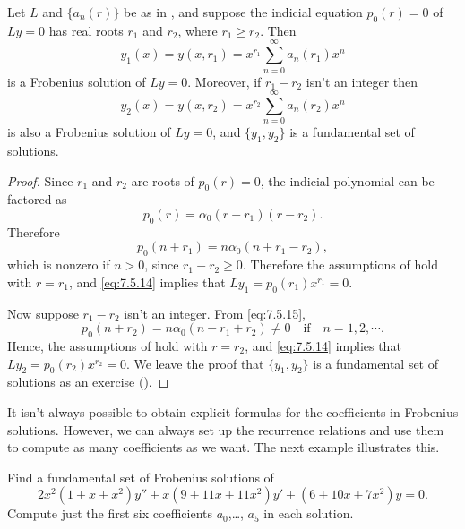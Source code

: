 \begin{theorem}\label{thmtype:7.5.3}
Let $L$ and $\{a_n(r)\}$ be as in , and
suppose the
indicial equation $p_0(r)=0$ of $Ly=0$ has real roots $r_1$ and $r_2$,
where $r_1\ge r_2$. Then
\[
y_1(x)=y(x,r_1)=x^{r_1}\sum_{n=0}^\infty a_n(r_1)x^n
\]
is a Frobenius solution of $Ly=0$. Moreover, if $r_1-r_2$ isn't  an
integer then
\[
y_2(x)=y(x,r_2)=x^{r_2}\sum_{n=0}^\infty a_n(r_2)x^n
\]
is also a Frobenius solution of $Ly=0$,
and $\{y_1,y_2\}$ is a fundamental set of solutions.
\end{theorem}

\begin{proof}
Since $r_1$ and $r_2$ are roots of $p_0(r)=0$, the indicial polynomial
can be factored as
\begin{equation} \label{eq:7.5.15}
p_0(r)=\alpha_0(r-r_1)(r-r_2).
\end{equation}
Therefore
\[
p_0(n+r_1)=n\alpha_0(n+r_1-r_2),
\]
which is nonzero if $n>0$, since $r_1-r_2\ge0$. Therefore the
assumptions of  hold with $r=r_1$, and
\eqref{eq:7.5.14} implies that $Ly_1=p_0(r_1)x^{r_1}=0$.

Now suppose $r_1-r_2$ isn't an integer. From \eqref{eq:7.5.15},
\[
p_0(n+r_2)=n\alpha_0(n-r_1+r_2)\ne0\quad\text{if}\quad n=1,2,\cdots.
\]
Hence, the assumptions of  hold with $r=r_2$,
and \eqref{eq:7.5.14} implies that $Ly_2=p_0(r_2)x^{r_2}=0$. We leave the
proof that $\{y_1,y_2\}$ is a fundamental set of solutions as an
exercise ().
\end{proof}

It isn't  always possible to obtain explicit formulas for the
coefficients in Frobenius solutions. However, we can always set up the
recurrence relations and use them to compute as many coefficients as we
want. The next example illustrates this.

\begin{example}\label{example:7.5.1}
Find a fundamental set of
Frobenius solutions of
\begin{equation} \label{eq:7.5.16}
2x^2(1+x+x^2)y''+x(9+11x+11x^2)y'+(6+10x+7x^2)y=0.
\end{equation}
Compute just the first six coefficients $a_0$,\dots, $a_5$ in each
solution.
\end{example}


